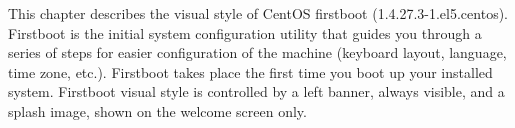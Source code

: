 This chapter describes the visual style of CentOS firstboot
(1.4.27.3-1.el5.centos). Firstboot is the initial system configuration
utility that guides you through a series of steps for easier
configuration of the machine (keyboard layout, language, time zone,
etc.). Firstboot takes place the first time you boot up your installed
system. Firstboot visual style is controlled by a left banner, always
visible, and a splash image, shown on the welcome screen only.


